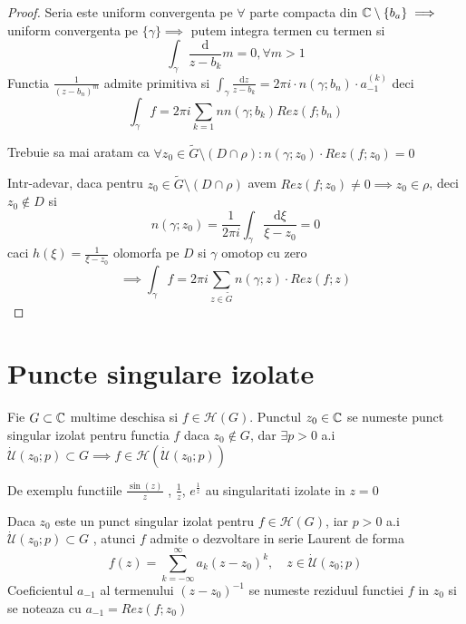 \begin{theorem}
\begin{proof}
        Seria este uniform convergenta pe $\forall$ parte compacta din
        $\mathbb{C} \setminus \{b_a \} \implies$ uniform convergenta pe
        $\{ \gamma \} \implies$ putem integra termen cu termen si
        \[
            \int_{\gamma} \frac{\mathrm{d}}{z-b_k} m = 0 , \forall m>1
        \]
        Functia $\displaystyle \frac{1}{(z-b_n)^m}$ admite primitiva si
        $\displaystyle
            \int_{\gamma} \frac{\mathrm{d}z} {z - b_k} = 2 \pi i \cdot n(\gamma;b_n) \cdot a_{-1}^{(k)}
        $ deci
        \[
            \int_{\gamma} f = 2 \pi i \sum_{k=1}{n} n(\gamma; b_k) Rez(f;b_n)
        \]

        Trebuie sa mai aratam ca $\forall z_0 \in \widetilde{G} \setminus(D \cap \rho)
        \colon n(\gamma; z_0)\cdot Rez(f;z_0) = 0$

        Intr-adevar, daca pentru
        $z_0\in \widetilde{G} \setminus (D\cap\rho)$ avem
        $Rez(f;z_0) \neq 0 \implies z_0 \in \rho $, deci $z_0\notin D$ si
        \[
            n(\gamma;z_0) = \frac{1}{2 \pi i} \int_{\gamma}
            \frac{\mathrm{d} \xi}{\xi - z_0} = 0
        \]
        caci $h(\xi) = \frac{1}{\xi - z_0}$ olomorfa pe $D$ si $\gamma$ omotop cu zero
        \[
            \implies \int_{\gamma} f = 2 \pi i \sum_{z\in \widetilde{G}} n(\gamma;z) \cdot Rez(f;z)
        \]

    \end{proof}
\end{theorem}

\section{Puncte singulare izolate}

\begin{definition}
    Fie $G\subset \mathbb{C}$ multime deschisa si $f\in\mathcal{H}(G)$. Punctul $z_0 \in \mathbb{C}$
    se numeste punct singular izolat pentru functia $f$ daca $z_0 \notin G$, dar
    $\exists p>0$ a.i
    $\mathcal{\dot{U}}(z_0;p)\subset G \implies f \in \mathcal{H}(\mathcal{\dot{U}}(z_0;p))$
\end{definition}

\begin{observation}
    De exemplu functiile $\frac{\sin(z)}{z}$ , $\frac{1}{z}$, $e^{\frac{1}{z}}$
    au singularitati izolate in $z=0$
\end{observation}

\begin{observation}
    Daca $z_0$ este un punct singular izolat pentru $f\in\mathcal{H}(G)$, iar
    $p>0$ a.i $\mathcal{\dot{U}}(z_0;p)\subset G$ , atunci $f$ admite o dezvoltare in
    serie Laurent de forma
    \[
        f(z) = \sum_{k=-\infty}^{\infty} a_{k}(z-z_0)^{k},\quad z\in \mathcal{\dot{U}}(z_0;p)
    \]
    Coeficientul $a_{-1}$ al termenului $(z-z_0)^{-1}$ se numeste reziduul functiei $f$
    in $z_0$ si se noteaza cu $a_{-1} = Rez(f;z_0)$
\end{observation}

